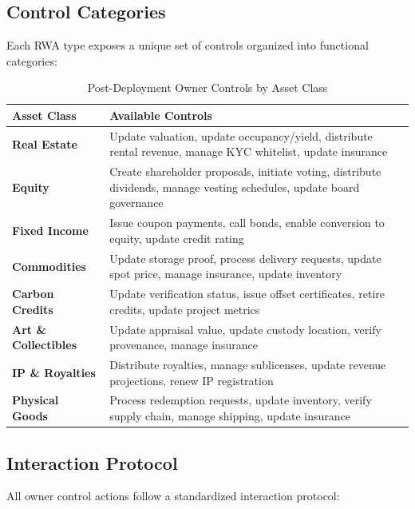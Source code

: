 \documentclass[11pt,a4paper,twoside]{article}
\begin{document}
\subsection{Control Categories}

Each RWA type exposes a unique set of controls organized into functional categories:

\begin{table}[H]
\centering
\caption{Post-Deployment Owner Controls by Asset Class}
\label{tab:owner-controls}
\footnotesize
\begin{tabularx}{\textwidth}{@{}l|X@{}}
\toprule
\textbf{Asset Class} & \textbf{Available Controls} \\
\midrule
\textbf{Real Estate} & Update valuation, update occupancy/yield, distribute rental revenue, manage KYC whitelist, update insurance \\
\midrule
\textbf{Equity} & Create shareholder proposals, initiate voting, distribute dividends, manage vesting schedules, update board governance \\
\midrule
\textbf{Fixed Income} & Issue coupon payments, call bonds, enable conversion to equity, update credit rating \\
\midrule
\textbf{Commodities} & Update storage proof, process delivery requests, update spot price, manage insurance, update inventory \\
\midrule
\textbf{Carbon Credits} & Update verification status, issue offset certificates, retire credits, update project metrics \\
\midrule
\textbf{Art \& Collectibles} & Update appraisal value, update custody location, verify provenance, manage insurance \\
\midrule
\textbf{IP \& Royalties} & Distribute royalties, manage sublicenses, update revenue projections, renew IP registration \\
\midrule
\textbf{Physical Goods} & Process redemption requests, update inventory, verify supply chain, manage shipping, update insurance \\
\bottomrule
\end{tabularx}
\end{table}

\subsection{Interaction Protocol}

All owner control actions follow a standardized interaction protocol:
\end{document}
